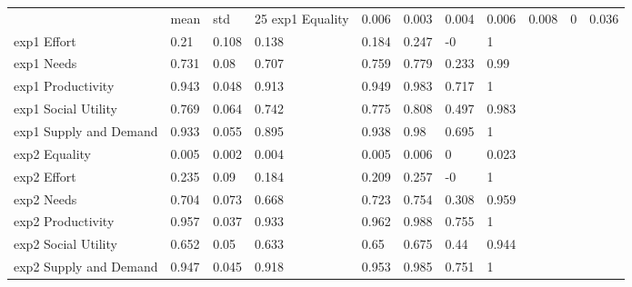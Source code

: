 \begin{tabular}{llllllll}
\toprule
 & mean & std & 25%
\midrule
exp1 Equality & 0.006 & 0.003 & 0.004 & 0.006 & 0.008 & 0 & 0.036 \\
exp1 Effort & 0.21 & 0.108 & 0.138 & 0.184 & 0.247 & -0 & 1 \\
exp1 Needs & 0.731 & 0.08 & 0.707 & 0.759 & 0.779 & 0.233 & 0.99 \\
exp1 Productivity & 0.943 & 0.048 & 0.913 & 0.949 & 0.983 & 0.717 & 1 \\
exp1 Social Utility & 0.769 & 0.064 & 0.742 & 0.775 & 0.808 & 0.497 & 0.983 \\
exp1 Supply and Demand & 0.933 & 0.055 & 0.895 & 0.938 & 0.98 & 0.695 & 1 \\
exp2 Equality & 0.005 & 0.002 & 0.004 & 0.005 & 0.006 & 0 & 0.023 \\
exp2 Effort & 0.235 & 0.09 & 0.184 & 0.209 & 0.257 & -0 & 1 \\
exp2 Needs & 0.704 & 0.073 & 0.668 & 0.723 & 0.754 & 0.308 & 0.959 \\
exp2 Productivity & 0.957 & 0.037 & 0.933 & 0.962 & 0.988 & 0.755 & 1 \\
exp2 Social Utility & 0.652 & 0.05 & 0.633 & 0.65 & 0.675 & 0.44 & 0.944 \\
exp2 Supply and Demand & 0.947 & 0.045 & 0.918 & 0.953 & 0.985 & 0.751 & 1 \\
\bottomrule
\end{tabular}
